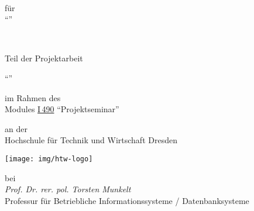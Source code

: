 \begin{titlepage}

\ \vspace{5cm}

	\centering
	{
		\scshape\Huge \DOCNAME \par
	}
	\vspace{1cm}
	{
		\LARGE für \\%
		\enquote{\ProjTitle{}} \par
	}




\vfill

\newpage


\,

\vspace{4cm}

{

{
	\large{ Teil der Projektarbeit } \par \vspace{.2cm}
	\LARGE{ \enquote{\ProjTitle{}} }
	\par \vspace{.4cm}
	\scriptsize {
		im Rahmen des
	} \\
	Modules \href{https://apps.htw-dresden.de/modulux.php?mod=2071}{I\,490} \enquote{Projektseminar} \par \vspace{.3cm}

	\scriptsize{
		an der
	} \\
	\large{
		Hochschule für Technik und Wirtschaft Dresden
	}

		\par \vspace{.5cm}
		\centering
		\texttt{[image: img/htw-logo]}
		\par \vspace{.3cm}

	\scriptsize{
		bei
	} \\
	\emph{
		Prof. Dr. rer. pol. Torsten Munkelt
	} \\
	\footnotesize{
		Professur für Betriebliche Informationssysteme / Datenbanksysteme
	} \par \vspace{.3cm}

}}
\end{titlepage}
